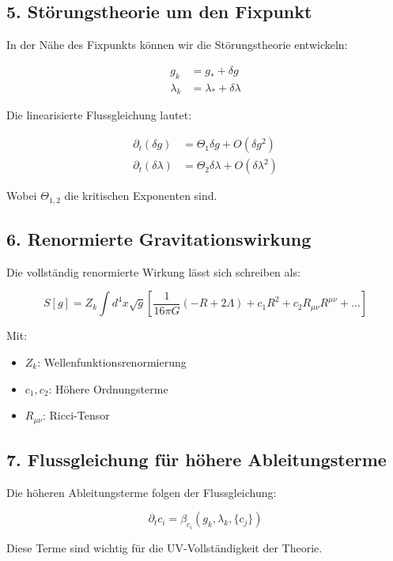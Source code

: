 \documentclass{article}
\begin{document}
\subsection{5. Störungstheorie um den Fixpunkt}

In der Nähe des Fixpunkts können wir die Störungstheorie entwickeln:

\begin{align*}
	g_k &= g_* + \delta g \\
	\lambda_k &= \lambda_* + \delta \lambda
\end{align*}

Die linearisierte Flussgleichung lautet:

\begin{align*}
	\partial_t (\delta g) &= \Theta_1 \delta g + O(\delta g^2) \\
	\partial_t (\delta \lambda) &= \Theta_2 \delta \lambda + O(\delta \lambda^2)
\end{align*}

Wobei $\Theta_{1,2}$ die kritischen Exponenten sind.

\subsection{6. Renormierte Gravitationswirkung}

Die vollständig renormierte Wirkung lässt sich schreiben als:

\[
S[g] = Z_k \int d^4x \sqrt{g} \left[\frac{1}{16\pi G} \left(-R + 2\Lambda\right) + c_1 R^2 + c_2 R_{\mu\nu} R^{\mu\nu} + \dots\right]
\]

Mit:

\begin{itemize}
	\item $Z_k$: Wellenfunktionsrenormierung
	\item $c_1,c_2$: Höhere Ordnungsterme
	\item $R_{\mu\nu}$: Ricci-Tensor
\end{itemize}

\subsection{7. Flussgleichung für höhere Ableitungsterme}

Die höheren Ableitungsterme folgen der Flussgleichung:

\[
\partial_t c_i = \beta_{c_i}(g_k,\lambda_k,\{c_j\})
\]

Diese Terme sind wichtig für die UV-Vollständigkeit der Theorie.
\end{document}
